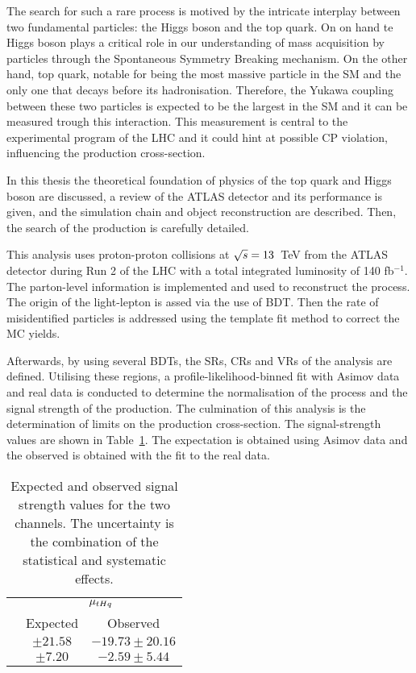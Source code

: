 The search for such a rare process is motived by the intricate interplay between two fundamental 
particles: the Higgs boson and the top quark. On on hand te Higgs boson plays a critical role in our understanding 
of mass acquisition by particles through the Spontaneous Symmetry Breaking mechanism.
On the other hand, top quark, notable for being the most massive particle in the SM and the only one that 
decays before its hadronisation. Therefore, the Yukawa coupling between these two particles is expected 
to be the largest in the SM and it can be measured trough this interaction.  This measurement is central
to the experimental program of the LHC and it could hint at possible 
CP violation, influencing the \tHq production cross-section.
 
In this thesis the theoretical foundation of physics of the top quark and Higgs boson are
discussed, a review of the ATLAS detector and its performance is given, and the simulation chain 
and object reconstruction are described. Then, the search of the \tHq production is carefully detailed. 

This analysis uses proton-proton collisions at $\sqrt{s}=13$~TeV from the ATLAS detector during Run 2 of the LHC
with a total integrated luminosity of 140 fb$^{-1}$. The parton-level information is implemented and used to
reconstruct the \tHq process. The origin of the light-lepton is assed via the use of BDT. 
Then the rate of misidentified particles is addressed using the template fit method to correct
the MC yields. 

Afterwards, by using several BDTs, the SRs, CRs and VRs of the analysis are defined.
Utilising these regions, a profile-likelihood-binned fit with Asimov data and real data  is 
conducted to determine the normalisation of the \ttW process and the signal strength of 
the \tHq production. 
The culmination of this analysis is the determination of limits on the \tHq production cross-section.
The \tHq signal-strength values are shown in Table~\ref{tab:Conclusion:SignalStrength}.
The expectation is obtained using Asimov data and the observed is obtained with the fit
to the real data. 

\begin{table}[h]
\centering
\begin{tabular}{l|c|c}
\cline{2-3}
            		& \multicolumn{2}{c}{$\mu_{tHq}$} 		\\ \cline{2-3}
            		& Expected       & Observed			\\ \midrule
\dilepOStau 	& $\pm 21.58$  &  $-19.73 \pm 20.16$  	\\
\dilepSStau 	& $\pm 7.20$ 	&  $-2.59 \pm 5.44$          	\\ \bottomrule
\end{tabular}
\caption{Expected and observed signal strength values for the two \dileptau channels.
The uncertainty is the combination of the statistical and systematic effects.}
\label{tab:Conclusion:SignalStrength}
\end{table}

